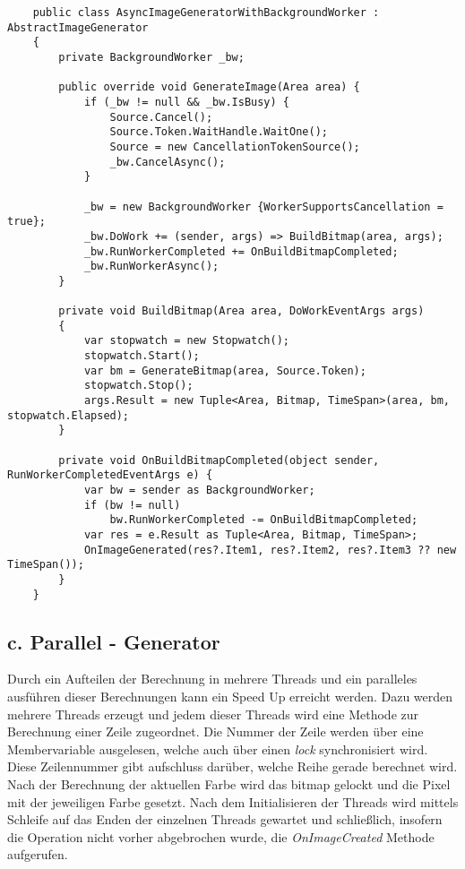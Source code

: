\documentclass[a4paper,ngerman]{scrartcl}
\begin{document}
\begin{lstlisting}
    public class AsyncImageGeneratorWithBackgroundWorker : AbstractImageGenerator
    {
        private BackgroundWorker _bw;

        public override void GenerateImage(Area area) {
            if (_bw != null && _bw.IsBusy) {
                Source.Cancel();
                Source.Token.WaitHandle.WaitOne();
                Source = new CancellationTokenSource();
                _bw.CancelAsync();
            }

            _bw = new BackgroundWorker {WorkerSupportsCancellation = true};
            _bw.DoWork += (sender, args) => BuildBitmap(area, args);
            _bw.RunWorkerCompleted += OnBuildBitmapCompleted;
            _bw.RunWorkerAsync();
        }

        private void BuildBitmap(Area area, DoWorkEventArgs args)
        {
            var stopwatch = new Stopwatch();
            stopwatch.Start();
            var bm = GenerateBitmap(area, Source.Token);
            stopwatch.Stop();
            args.Result = new Tuple<Area, Bitmap, TimeSpan>(area, bm, stopwatch.Elapsed);
        }

        private void OnBuildBitmapCompleted(object sender, RunWorkerCompletedEventArgs e) {
            var bw = sender as BackgroundWorker;
            if (bw != null)
                bw.RunWorkerCompleted -= OnBuildBitmapCompleted;
            var res = e.Result as Tuple<Area, Bitmap, TimeSpan>;
            OnImageGenerated(res?.Item1, res?.Item2, res?.Item3 ?? new TimeSpan());
        }
    }
\end{lstlisting}

\subsection{c. Parallel - Generator}
Durch ein Aufteilen der Berechnung in mehrere Threads und ein paralleles ausführen dieser Berechnungen kann ein Speed Up erreicht werden. Dazu werden mehrere Threads erzeugt und jedem dieser Threads wird eine Methode zur Berechnung einer Zeile zugeordnet. Die Nummer der Zeile werden über eine Membervariable ausgelesen, welche auch über einen \textit{lock} synchronisiert wird. Diese Zeilennummer gibt aufschluss darüber, welche Reihe gerade berechnet wird. Nach der Berechnung der aktuellen Farbe wird das bitmap gelockt und die Pixel mit der jeweiligen Farbe gesetzt. Nach dem Initialisieren der Threads wird mittels Schleife auf das Enden der einzelnen Threads gewartet und schließlich, insofern die Operation nicht vorher abgebrochen wurde, die \textit{OnImageCreated} Methode aufgerufen.
\end{document}
